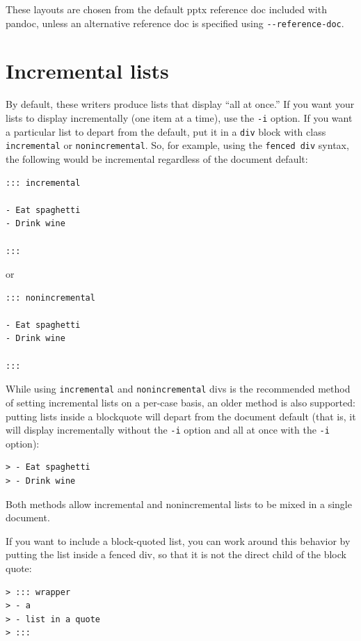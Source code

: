 \documentclass[
  b5paper
]{book}
\begin{document}
These layouts are chosen from the default pptx reference doc included
with pandoc, unless an alternative reference doc is specified using
\texttt{-\/-reference-doc}.

\section{Incremental lists}\label{incremental-lists}

By default, these writers produce lists that display ``all at once.'' If
you want your lists to display incrementally (one item at a time), use
the \texttt{-i} option. If you want a particular list to depart from the
default, put it in a \texttt{div} block with class \texttt{incremental}
or \texttt{nonincremental}. So, for example, using the
\texttt{fenced\ div} syntax, the following would be incremental
regardless of the document default:

\begin{verbatim}
::: incremental

- Eat spaghetti
- Drink wine

:::
\end{verbatim}

or

\begin{verbatim}
::: nonincremental

- Eat spaghetti
- Drink wine

:::
\end{verbatim}

While using \texttt{incremental} and \texttt{nonincremental} divs is the
recommended method of setting incremental lists on a per-case basis, an
older method is also supported: putting lists inside a blockquote will
depart from the document default (that is, it will display incrementally
without the \texttt{-i} option and all at once with the \texttt{-i}
option):

\begin{verbatim}
> - Eat spaghetti
> - Drink wine
\end{verbatim}

Both methods allow incremental and nonincremental lists to be mixed in a
single document.

If you want to include a block-quoted list, you can work around this
behavior by putting the list inside a fenced div, so that it is not the
direct child of the block quote:

\begin{verbatim}
> ::: wrapper
> - a
> - list in a quote
> :::
\end{verbatim}
\end{document}
